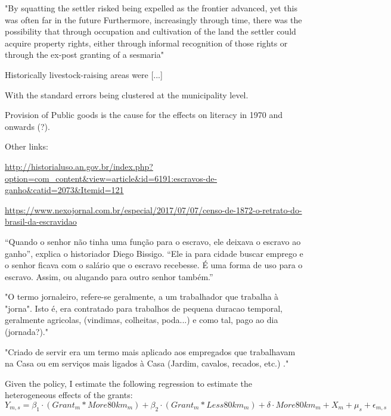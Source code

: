 \documentclass{article}
\begin{document}
"By squatting the settler risked being expelled as the frontier  advanced, yet this was often  far  in the future   Furthermore,  increasingly   through time, there was the possibility that through occupation and cultivation of the land the settler could acquire  property rights, either through  informal  recognition of those rights or through the ex-post granting of a  sesmaria"

Historically livestock-raising areas were [...]

With the standard errors being clustered at the municipality level. 


Provision of Public goods is the cause for the effects on literacy in 1970 and onwards (?).

Other links:

\url{http://historialuso.an.gov.br/index.php?option=com_content&view=article&id=6191:escravos-de-ganho&catid=2073&Itemid=121}

\url{https://www.nexojornal.com.br/especial/2017/07/07/censo-de-1872-o-retrato-do-brasil-da-escravidao}

“Quando o senhor não tinha uma função para o escravo, ele deixava o escravo ao ganho”, explica o historiador Diego Bissigo. “Ele ia para cidade buscar emprego e o senhor ficava com o salário que o escravo recebesse. É uma forma de uso para o escravo. Assim, ou alugando para outro senhor também.”

"O termo jornaleiro, refere-se geralmente, a um trabalhador que trabalha à "jorna". Isto é, era contratado para trabalhos de pequena duracao temporal, geralmente agricolas, (vindimas, colheitas, poda...) e como tal, pago ao dia (jornada?)."

"Criado de servir era um termo mais aplicado aos empregados que trabalhavam na Casa ou em serviços mais ligados à Casa (Jardim, cavalos, recados, etc.) ."

\parencite[p.~142]{De_Oliveira_Andrade1980-xz}


Given the policy, I estimate the following regression to estimate the heterogeneous effects of the grants:
\begin{equation}
  \label{eqn:livestock}
  Y_{m,s} = \beta_1 \cdot (Grant_m  * More80km_m) + \beta_2 \cdot (Grant_m * Less80km_m) + \delta \cdot  More80km_m + X_{m} + \mu_s + \epsilon_{m,s}
\end{equation}
\end{document}
